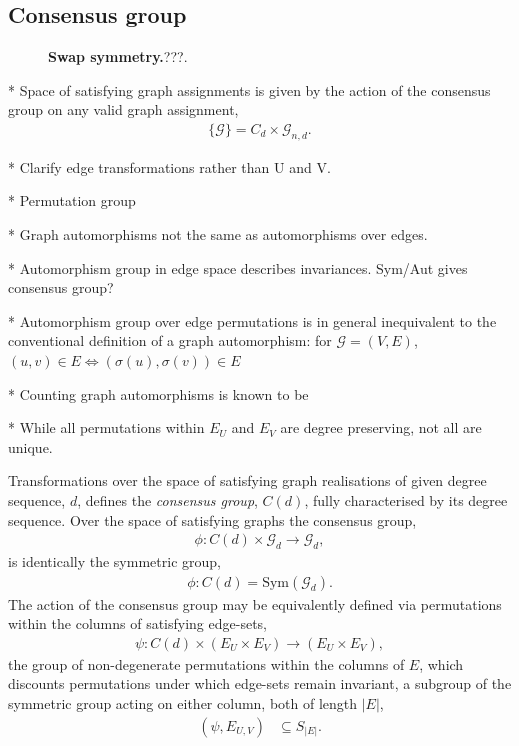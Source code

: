 \subsection{Consensus group} \label{sec:assign_group}

\begin{figure}[!htb]
	\centering
	
	\caption{\textbf{Swap symmetry.}???.}\label{fig:swap_symmetry}
\end{figure}

* Space of satisfying graph assignments is given by the action of the consensus group on any valid graph assignment,
\begin{align}
	\{\mathcal{G}\} = C_d \times \mathcal{G}_{n,d}.
\end{align}


* Clarify edge transformations rather than U and V.

* Permutation group

* Graph automorphisms not the same as automorphisms over edges.

* Automorphism group in edge space describes invariances. Sym/Aut gives consensus group?

* Automorphism group over edge permutations is in general inequivalent to the conventional definition of a graph automorphism: for $\mathcal{G}=(V,E)$, $(u,v)\in E \Leftrightarrow (\sigma(u),\sigma(v))\in E$ %

* Counting graph automorphisms is known to be

* While all permutations within $E_U$ and $E_V$ are degree preserving, not all are unique.

Transformations over the space of satisfying graph realisations of given degree sequence, $d$, defines the \emph{consensus group}, $C(d)$, fully characterised by its degree sequence. Over the space of satisfying graphs the consensus group,
\begin{align}
	\phi: C(d)\times \mathcal{G}_d \to \mathcal{G}_d,
\end{align}
is identically the symmetric group,
\begin{align}
	\phi: C(d) = \mathrm{Sym}(\mathcal{G}_d).
\end{align}
The action of the consensus group may be equivalently defined via permutations within the columns of satisfying edge-sets,
\begin{align}
	\psi: C(d)\times (E_U\times E_V) \to (E_U\times E_V),
\end{align}
the group of non-degenerate permutations within the columns of $E$, which discounts permutations under which edge-sets remain invariant, a subgroup of the symmetric group acting on either column, both of length $|E|$,
\begin{align}
	(\psi, E_{U,V}) & \subseteq S_{|E|}.
\end{align}

